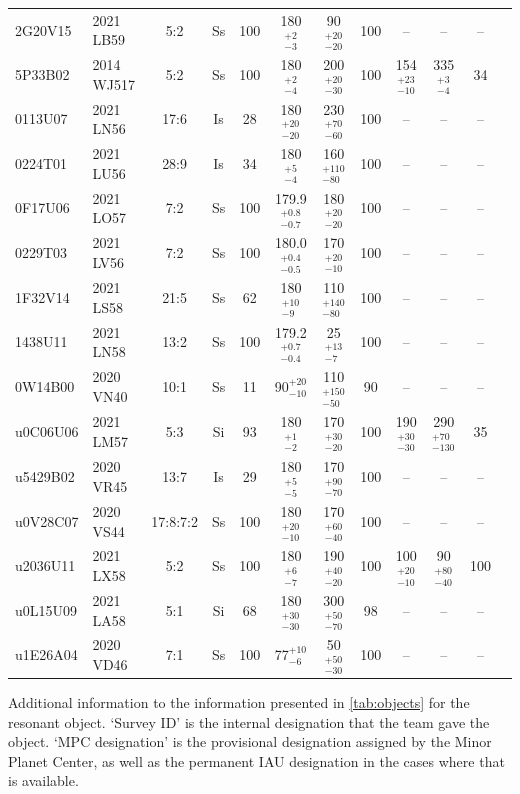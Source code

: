 \begin{longrotatetable}
\begin{longtable}{ll|ccccccccc | l}
2G20V15 & 2021 LB59 & 5:2 & Ss & 100 & 180$_{-3}^{+2}$ & 90$_{-20}^{+20}$ & 100 & -- & -- & -- & \\ 
5P33B02 & 2014 WJ517 & 5:2 & Ss & 100 & 180$_{-4}^{+2}$ & 200$_{-30}^{+20}$ & 100 & 154$_{-10}^{+23}$ & 335$_{-4}^{+3}$ & 34 & \\ 
0113U07 & 2021 LN56 & 17:6 & Is & 28 & 180$_{-20}^{+20}$ & 230$_{-60}^{+70}$ & 100 & -- & -- & -- & \\ 
0224T01 & 2021 LU56 & 28:9 & Is & 34 & 180$_{-4}^{+5}$ & 160$_{-80}^{+110}$ & 100 & -- & -- & -- & \\ 
0F17U06 & 2021 LO57 & 7:2 & Ss & 100 & 179.9$_{-0.7}^{+0.8}$ & 180$_{-20}^{+20}$ & 100 & -- & -- & -- & \\ 
0229T03 & 2021 LV56 & 7:2 & Ss & 100 & 180.0$_{-0.5}^{+0.4}$ & 170$_{-10}^{+20}$ & 100 & -- & -- & -- & \\ 
1F32V14 & 2021 LS58 & 21:5 & Ss & 62 & 180$_{-9}^{+10}$ & 110$_{-80}^{+140}$ & 100 & -- & -- & -- & \\ 
1438U11 & 2021 LN58 & 13:2 & Ss & 100 & 179.2$_{-0.4}^{+0.7}$ & 25$_{-7}^{+13}$ & 100 & -- & -- & -- & \\ 
0W14B00 & 2020 VN40 & 10:1 & Ss & 11 & 90$_{-10}^{+20}$ & 110$_{-50}^{+150}$ & 90 & -- & -- & -- & \\ 
\hline
u0C06U06 & 2021 LM57 & 5:3 & Si & 93 & 180$_{-2}^{+1}$ & 170$_{-20}^{+30}$ & 100 & 190$_{-30}^{+30}$ & 290$_{-130}^{+70}$ & 35 & \\ 
u5429B02 & 2020 VR45 & 13:7 & Is & 29 & 180$_{-5}^{+5}$ & 170$_{-70}^{+90}$ & 100 & -- & -- & -- & \\ 
u0V28C07 & 2020 VS44 & 17:8:7:2 & Ss & 100 & 180$_{-10}^{+20}$ & 170$_{-40}^{+60}$ & 100 & -- & -- & -- & \\ 
u2036U11 & 2021 LX58 & 5:2 & Ss & 100 & 180$_{-7}^{+6}$ & 190$_{-20}^{+40}$ & 100 & 100$_{-10}^{+20}$ & 90$_{-40}^{+80}$ & 100 & \\ 
u0L15U09 & 2021 LA58 & 5:1 & Si & 68 & 180$_{-30}^{+30}$ & 300$_{-70}^{+50}$ & 98 & -- & -- & -- & \\ 
u1E26A04 & 2020 VD46 & 7:1 & Ss & 100 & 77$_{-6}^{+10}$ & 50$_{-30}^{+50}$ & 100 & -- & -- & -- & \\ 
\hline\hline
\end{longtable}
\footnotesize{
Additional information to the information presented in \autoref{tab:objects} for the resonant object. 
`Survey ID' is the internal designation that the \lido team gave the object.
`MPC designation' is the provisional designation assigned by the Minor Planet Center, as well as the permanent IAU designation in the cases where that is available.
}
\end{longrotatetable}
